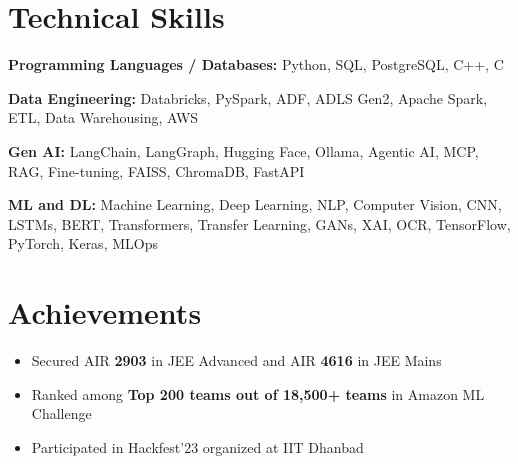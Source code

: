 \documentclass[a4paper,10pt]{article}
\begin{document}
\section{Technical Skills}

\small
\textbf{Programming Languages / Databases:}
Python, SQL, PostgreSQL, C++, C

\vspace{2pt}

\textbf{Data Engineering:}
Databricks, PySpark, ADF, ADLS Gen2, Apache Spark, ETL, Data Warehousing, AWS

\vspace{2pt}

\textbf{Gen AI:}
LangChain, LangGraph, Hugging Face, Ollama, Agentic AI, MCP, RAG, Fine-tuning, FAISS, ChromaDB, FastAPI

\vspace{2pt}

\textbf{ML and DL:}
Machine Learning, Deep Learning, NLP, Computer Vision, CNN, LSTMs, BERT, Transformers, Transfer Learning, GANs, XAI, OCR, TensorFlow, PyTorch, Keras, MLOps

\section{Achievements}

\begin{itemize}[leftmargin=0.18in,itemsep=2pt]
\item Secured AIR \textbf{2903} in JEE Advanced and AIR \textbf{4616} in JEE Mains
\item Ranked among \textbf{Top 200 teams out of 18,500+ teams} in Amazon ML Challenge
\item Participated in Hackfest'23 organized at IIT Dhanbad
\end{itemize}
\end{document}
